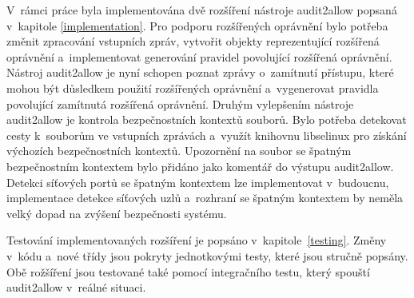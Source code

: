 V~rámci práce byla implementována dvě rozšíření nástroje audit2allow popsaná
v~kapitole \ref{implementation}. Pro podporu rozšířených oprávnění bylo potřeba
změnit zpracování vstupních zpráv, vytvořit objekty reprezentující rozšířená
oprávnění a~implementovat generování pravidel povolující rozšířená oprávnění.
Nástroj audit2allow je nyní schopen poznat zprávy o~zamítnutí přístupu, které
mohou být důsledkem použití rozšířených oprávnění a~vygenerovat pravidla
povolující zamítnutá rozšířená oprávnění.
Druhým vylepšením nástroje audit2allow je kontrola bezpečnostních kontextů
souborů. Bylo potřeba detekovat cesty k~souborům ve vstupních zprávách a~využít
knihovnu libselinux pro získání výchozích bezpečnostních kontextů. Upozornění na
soubor se špatným bezpečnostním kontextem bylo přidáno jako komentář do výstupu
audit2allow. Detekci síťových portů se špatným kontextem lze implementovat
v~budoucnu, implementace detekce síťových uzlů a~rozhraní se špatným kontextem
by neměla velký dopad na zvýšení bezpečnosti systému.

Testování implementovaných rozšíření je popsáno v~kapitole~\ref{testing}. Změny
v~kódu a~nové třídy jsou pokryty jednotkovými testy, které jsou stručně popsány.
Obě rožšíření jsou testované také pomocí integračního testu, který spouští
audit2allow v~reálné situaci.

